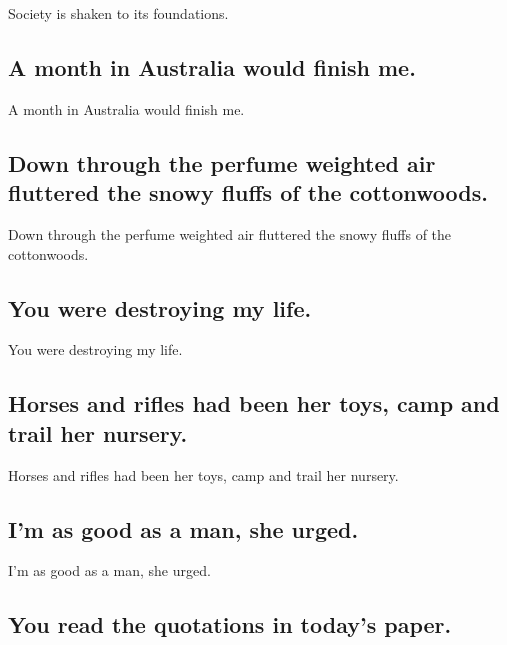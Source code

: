 \documentclass[]{article}
\begin{document}
Society is shaken to its foundations.

\hypertarget{a-month-in-australia-would-finish-me.}{%
\subsection{A month in Australia would finish
me.}\label{a-month-in-australia-would-finish-me.}}

A month in Australia would finish me.

\hypertarget{down-through-the-perfume-weighted-air-fluttered-the-snowy-fluffs-of-the-cottonwoods.}{%
\subsection{Down through the perfume weighted air fluttered the snowy
fluffs of the
cottonwoods.}\label{down-through-the-perfume-weighted-air-fluttered-the-snowy-fluffs-of-the-cottonwoods.}}

Down through the perfume weighted air fluttered the snowy fluffs of the
cottonwoods.

\hypertarget{you-were-destroying-my-life.}{%
\subsection{You were destroying my
life.}\label{you-were-destroying-my-life.}}

You were destroying my life.

\hypertarget{horses-and-rifles-had-been-her-toys-camp-and-trail-her-nursery.}{%
\subsection{Horses and rifles had been her toys, camp and trail her
nursery.}\label{horses-and-rifles-had-been-her-toys-camp-and-trail-her-nursery.}}

Horses and rifles had been her toys, camp and trail her nursery.

\hypertarget{im-as-good-as-a-man-she-urged.}{%
\subsection{I'm as good as a man, she
urged.}\label{im-as-good-as-a-man-she-urged.}}

I'm as good as a man, she urged.

\hypertarget{you-read-the-quotations-in-todays-paper.}{%
\subsection{You read the quotations in today's
paper.}\label{you-read-the-quotations-in-todays-paper.}}
\end{document}
